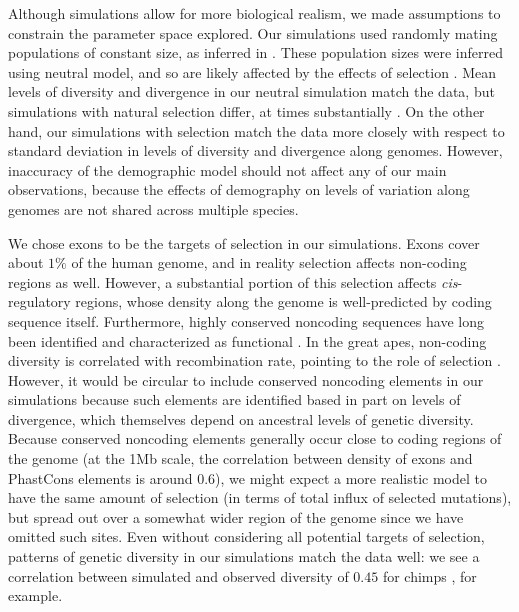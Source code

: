 Although simulations allow for more biological realism,
we made assumptions to constrain the parameter space explored.
Our simulations used randomly mating populations of constant size, as inferred in \citet{prado-martinez_great_2013}.
These population sizes were inferred using neutral model, and so are likely affected by the effects of selection \citep{jensen_distinguishing_2005}.
Mean levels of diversity and divergence in our neutral simulation match the data,
but simulations with natural selection differ, at times substantially .
On the other hand,
our simulations with selection match the data more closely with respect to standard deviation in levels of diversity and divergence along genomes.
However, inaccuracy of the demographic model should not affect any of our main observations,
because the effects of demography on levels of variation along genomes are not shared across multiple species.

We chose exons to be the targets of selection in our simulations.
Exons cover about $1\%$ of the human genome, 
and in reality selection affects non-coding regions as well.
However, a substantial portion of this selection affects \emph{cis}-regulatory regions,
whose density along the genome is well-predicted by coding sequence itself.
Furthermore, highly conserved noncoding sequences have long been identified
and characterized as functional \citep{bejerano_ultraconserved_2004, siepel_evolutionarily_2005, katzman_human_2007}.
In the great apes, non-coding diversity is correlated with recombination rate, pointing to the role of selection \citep{castellano_impact_2020}.
However, it would be circular to include conserved noncoding elements in our simulations because
such elements are identified based in part on levels of divergence,
which themselves depend on ancestral levels of genetic diversity.
Because conserved noncoding elements generally occur close to coding regions of the genome
(at the 1Mb scale, the correlation between density of exons and PhastCons elements is around $0.6$),
we might expect a more realistic model to have the same amount of selection (in terms of total influx of selected mutations),
but spread out over a somewhat wider region of the genome since we have omitted such sites.
Even without considering all potential targets of selection,
patterns of genetic diversity in our simulations match the data well:
we see a correlation between simulated and observed diversity of $0.45$ for chimps , for example.

